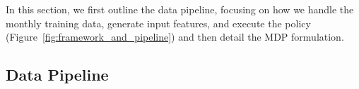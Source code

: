 

In this section, we first outline the data pipeline, focusing on how we handle the monthly training data, generate input features, and execute the policy (Figure~\ref{fig:framework_and_pipeline}) and then detail the MDP formulation. 
 

\subsection{Data Pipeline}
\label{ssec:pipeline}
    

